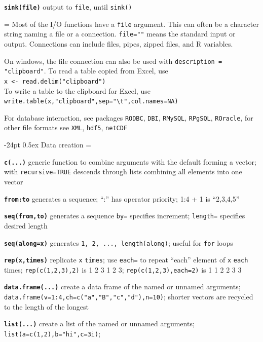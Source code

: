 \documentclass[10pt,landscape]{article}
\makeatletter
\renewcommand\section{\@startsection{section}{1}{0mm}%
                                     {-24pt}%
                                     {0.5ex}%
                                {\color{blue}\normalfont\large\bfseries}}
\newcommand{\code}{\texttt}
\newcommand{\bcode}[1]{\texttt{\textbf{#1}}}
\makeatother
\begin{document}
\begin{multicols*}{3}
\bcode{sink(file)} output to \code{file}, until \code{sink()}

\everypar={\hangindent=0mm}
Most of the I/O functions have a \code{file} argument. This can often
be a character string naming a file or a connection.  \code{file=""} means the standard input or
output. Connections can include files, pipes, zipped
files, and R variables. 

On windows, the file connection can also be used with \code{description =
"clipboard"}. To read a table copied from Excel, use \\
\code{x <- read.delim("clipboard")}\\
To write a table to the clipboard for Excel, use \\
\code{write.table(x,"clipboard",sep="\textbackslash t",col.names=NA)}

For database interaction, see packages \code{RODBC}, \code{DBI},
\code{RMySQL}, \code{RPgSQL}, \code{ROracle}, for other file formats see
\code{XML}, \code{hdf5}, \code{netCDF} 






\section{Data creation}
\everypar={\hangindent=9mm}

\bcode{c(...)} generic function to combine arguments with the default
forming a vector;
with \code{recursive=TRUE} descends through lists combining all elements
into one vector

\bcode{from:to} generates a sequence; ``:'' has operator priority; 1:4
+ 1 is ``2,3,4,5''

\bcode{seq(from,to)} generates a sequence
\code{by=} specifies increment; \code{length=} specifies desired length

\bcode{seq(along=x)} generates \code{1, 2, ..., length(along)}; useful for
\code{for} loops

\bcode{rep(x,times)} replicate \code{x} \code{times}; use \code{each=}
to repeat ``each'' element of \code{x} \code{each} times;
\code{rep(c(1,2,3),2)} is 1 2 3 1 2 3; \code{rep(c(1,2,3),each=2)} is 1 1 2 2 3 3 

\bcode{data.frame(...)} create a data frame of the named or unnamed arguments;
  \code{data.frame(v=1:4,ch=c("a","B","c","d"),n=10)}; shorter vectors
  are recycled to the length of the longest 

\bcode{list(...)} create a list of the named or unnamed arguments;
  \code{list(a=c(1,2),b="hi",c=3i)}; 


\end{multicols*}
\end{document}
